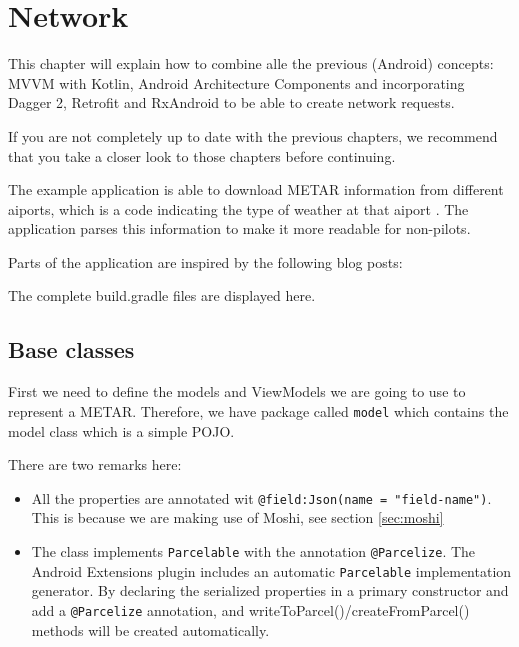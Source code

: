 
\chapter{Network}
This chapter will explain how to combine alle the previous (Android) concepts: MVVM with Kotlin, Android Architecture Components and incorporating Dagger 2, Retrofit and RxAndroid to be able to create network requests. 

If you are not completely up to date with the previous chapters, we recommend that you take a closer look to those chapters before continuing. 

The example application is able to download METAR information from different aiports, which is a code indicating the type of weather at that aiport \cite{Wikipedia2018}. The application parses this information to make it more readable for non-pilots. 

Parts of the application are inspired by the following blog posts: \cite{Gahfy2018, Tiwari2018, Saquib2018}

The complete build.gradle files are displayed here. 








\section{Base classes}
First we need to define the models and ViewModels we are going to use to represent a METAR. Therefore, we have package called \lstinline!model! which contains the model class which is a simple POJO.





There are two remarks here:
\begin{itemize}
	\item All the properties are annotated wit \lstinline!@field:Json(name = "field-name")!. This is because we are making use of Moshi, see section \ref{sec:moshi}
	\item  The class implements \lstinline|Parcelable| with the annotation \lstinline|@Parcelize|. The Android Extensions plugin  includes an automatic \lstinline|Parcelable| implementation generator. By declaring the serialized properties in a primary constructor and add a \lstinline|@Parcelize| annotation, and writeToParcel()/createFromParcel() methods will be created automatically.
\end{itemize}

